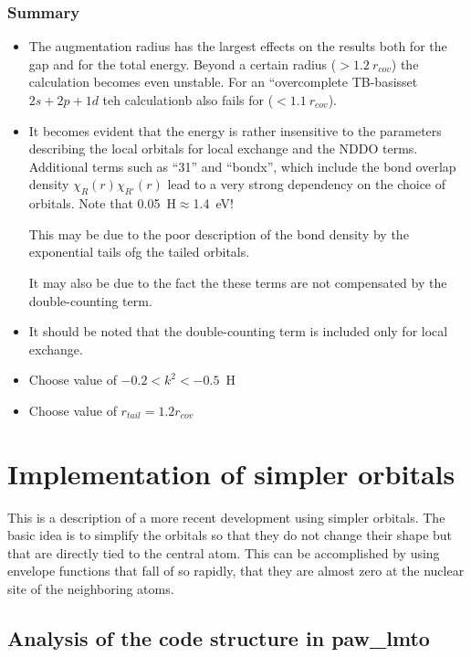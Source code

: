 \documentclass[11pt,a4paper]{report}
\begin{document}
\subsection{Summary}
\begin{itemize}
\item The augmentation radius has the largest effects on the results
  both for the gap and for the total energy. Beyond a certain radius
  ($>1.2~r_{cov}$) the calculation becomes even unstable. For an
  ``overcomplete TB-basisset $2s+2p+1d$ teh calculationb also fails for
  ($<1.1~r_{cov}$).
%
\item It becomes evident that the energy is rather insensitive to the
  parameters describing the local orbitals for local exchange and the
  NDDO terms. Additional terms such as ``31'' and ``bondx'', which
  include the bond overlap density $\chi_R(r)\chi_{R'}(r)$ lead to a
  very strong dependency on the choice of orbitals. Note that
  0.05~H$\approx$1.4~eV!

  This may be due to the poor description of the bond density by the
  exponential tails ofg the tailed orbitals.

  It may also be due to the fact the these terms are not compensated
  by the double-counting term.
% 
\item It should be noted that the double-counting term is included
  only for local exchange.
%
\item Choose value of $-0.2<k^2<-0.5$~H 
%
\item Choose value of $r_{tail}=1.2 r_{cov}$
\end{itemize}


\chapter{Implementation of simpler orbitals}
This is a description of a more recent development using simpler
orbitals. The basic idea is to simplify the orbitals so that they do
not change their shape but that are directly tied to the central
atom. This can be accomplished by using envelope functions that fall
of so rapidly, that they are almost zero at the nuclear site of the
neighboring atoms.


\section{Analysis of the code structure in paw\_lmto}
\end{document}
